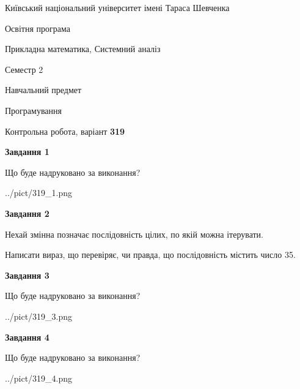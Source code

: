 \documentclass[12pt, ukrainian]{article}
\begin{document}
{{\begin {small}\par
{ \center  Київський національний університет імені Тараса Шевченка \par}
{\parbox {5 cm}{Освітня програма \hfill}{\parbox {8 cm}{Прикладна математика, Системний аналіз \hfill}}\parbox {5 cm}{\hfill Семестр 2}}\par
{\parbox {5 cm} {Навчальний предмет \hfill}\parbox {7 cm}{Програмування \hfill}\parbox {6cm}{\hfill}\par}\vspace{-7pt} \end{small}}{\center Контрольна робота, варіант  \No \textbf
{ 319 }\par}}
{
\begin {large}
{\begin {center}\textbf{Завдання 1}\end {center}}\par
Що буде надруковано за виконання?\par\par
\begin{center}
	{../pict/319_1.png}
\end{center}
\newpage

{\begin {center}\textbf{Завдання 2}\end {center}}\par
Нехай змінна  позначає послідовність цілих, по якій можна ітерувати.

Написати вираз, що перевіряє, чи правда, що послідовність  містить число 35.\par
\newpage

{\begin {center}\textbf{Завдання 3}\end {center}}\par
Що буде надруковано за виконання?\par
\begin{center}
	{../pict/319_3.png}
\end{center}
\newpage

{\begin {center}\textbf{Завдання 4}\end {center}}\par
Що буде надруковано за виконання?\par
\begin{center}
	{../pict/319_4.png}
\end{center}
\newpage


\end{large}}
\end{document}
